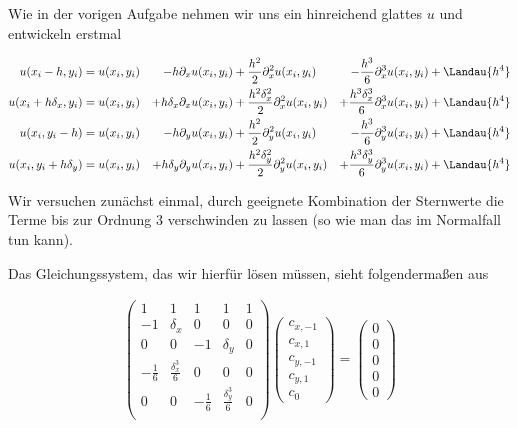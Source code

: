\begin{solution}
  Wie in der vorigen Aufgabe nehmen wir uns ein hinreichend glattes $u$ und entwickeln erstmal

  \begin{align*}
    u(x_i-h,y_i) &= u(x_i,y_i) &- h\partial_x u(x_i,y_i) &+ \frac{h^2}{2}\partial_x^2 u(x_i,y_i) &- \frac{h^3}{6}\partial_x^3 u(x_i,y_i) &+ \Landau{h^4}\\
    u(x_i+h\delta_x,y_i) &= u(x_i,y_i) &+ h\delta_x\partial_x u(x_i,y_i) &+ \frac{h^2 \delta_x^2}{2}\partial_x^2 u(x_i,y_i) &+ \frac{h^3 \delta_x^3}{6}\partial_x^3 u(x_i,y_i) &+ \Landau{h^4}\\
    u(x_i,y_i-h) &= u(x_i,y_i) &- h\partial_y u(x_i,y_i) &+ \frac{h^2}{2}\partial_y^2 u(x_i,y_i) &- \frac{h^3}{6}\partial_y^3 u(x_i,y_i) &+ \Landau{h^4}\\
    u(x_i,y_i+h\delta_y) &= u(x_i,y_i) &+ h\delta_y\partial_y u(x_i,y_i) &+ \frac{h^2 \delta_y^2}{2}\partial_y^2 u(x_i,y_i) &+ \frac{h^3 \delta_y^3}{6}\partial_y^3 u(x_i,y_i) &+ \Landau{h^4}
  \end{align*}

  Wir versuchen zunächst einmal, durch geeignete Kombination der Sternwerte die Terme bis zur Ordnung 3 verschwinden zu lassen (so wie man das im Normalfall tun kann).

  Das Gleichungssystem, das wir hierfür lösen müssen, sieht folgendermaßen aus

  \begin{align*}
    \begin{pmatrix}
      1 & 1 & 1 & 1 & 1 \\
      -1 & \delta_x & 0 & 0 & 0 \\
      0 & 0 & -1 & \delta_y & 0 \\
      -\frac{1}{6} & \frac{\delta_x^3}{6} & 0 & 0 & 0 \\
      0 & 0 & -\frac{1}{6} & \frac{\delta_y^3}{6} & 0 \\
    \end{pmatrix}
    \begin{pmatrix}
      c_{x,-1} \\
      c_{x,1} \\
      c_{y,-1} \\
      c_{y,1} \\
      c_{0}
    \end{pmatrix} =
    \begin{pmatrix}
      0 \\ 0 \\ 0 \\ 0 \\ 0
    \end{pmatrix}
  \end{align*}


\end{solution}
